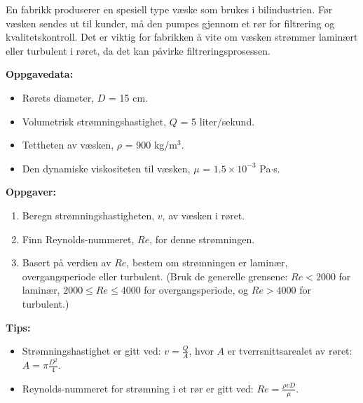


En fabrikk produserer en spesiell type væske som brukes i bilindustrien. Før væsken sendes ut til kunder, må den pumpes gjennom et rør for filtrering og kvalitetskontroll. Det er viktig for fabrikken å vite om væsken strømmer laminært eller turbulent i røret, da det kan påvirke filtreringsprosessen.

\textbf{Oppgavedata:}
\begin{itemize}
    \item Rørets diameter, \( D \) = 15 cm.
    \item Volumetrisk strømningshastighet, \( Q \) = 5 liter/sekund.
    \item Tettheten av væsken, \( \rho \) = 900 kg/m\(^3\).
    \item Den dynamiske viskositeten til væsken, \( \mu \) = \(1.5 \times 10^{-3}\) Pa\(\cdot\)s.
\end{itemize}

\textbf{Oppgaver:}
\begin{enumerate}
    \item Beregn strømningshastigheten, \( v \), av væsken i røret.
    \item Finn Reynolds-nummeret, \( Re \), for denne strømningen.
    \item Basert på verdien av \( Re \), bestem om strømningen er laminær, overgangsperiode eller turbulent. (Bruk de generelle grensene: \( Re < 2000 \) for laminær, \( 2000 \leq Re \leq 4000 \) for overgangsperiode, og \( Re > 4000 \) for turbulent.)
\end{enumerate}

\textbf{Tips:}
\begin{itemize}
    \item Strømningshastighet er gitt ved: \( v = \frac{Q}{A} \), hvor \( A \) er tverrsnittsarealet av røret: \( A = \pi \frac{D^2}{4} \).
    \item Reynolds-nummeret for strømning i et rør er gitt ved: \( Re = \frac{\rho v D}{\mu} \).
\end{itemize}










